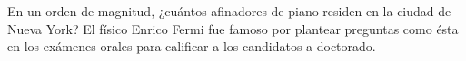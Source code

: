 \item En un orden de magnitud, ¿cuántos afinadores de piano residen en la ciudad de Nueva York? El físico Enrico Fermi fue famoso por plantear preguntas como ésta en los exámenes orales para calificar a los candidatos a doctorado.
